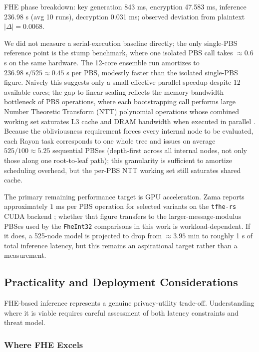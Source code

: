 \documentclass[12pt]{article}
\begin{document}
FHE phase breakdown: key generation 843 ms, encryption 47.583 ms, inference 236.98 s (avg 10 runs), decryption 0.031 ms; observed deviation from plaintext $|\Delta| = 0.0068$.

We did not measure a serial-execution baseline directly; the only single-PBS reference point is the stump benchmark, where one isolated PBS call takes $\approx 0.6$ s on the same hardware. The 12-core ensemble run amortizes to $236.98 \text{ s} / 525 \approx 0.45$ s per PBS, modestly faster than the isolated single-PBS figure. Naively this suggests only a small effective parallel speedup despite 12 available cores; the gap to linear scaling reflects the memory-bandwidth bottleneck of PBS operations, where each bootstrapping call performs large Number Theoretic Transform (NTT) polynomial operations whose combined working set saturates L3 cache and DRAM bandwidth when executed in parallel \cite{TFHE-rs}. Because the obliviousness requirement forces every internal node to be evaluated, each Rayon task corresponds to one whole tree and issues on average $525/100 \approx 5.25$ sequential PBSes (depth-first across all internal nodes, not only those along one root-to-leaf path); this granularity is sufficient to amortize scheduling overhead, but the per-PBS NTT working set still saturates shared cache.

The primary remaining performance target is GPU acceleration. Zama reports approximately $1$ ms per PBS operation for selected variants on the \texttt{tfhe-rs} CUDA backend \cite{TFHE-rs}; whether that figure transfers to the larger-message-modulus PBSes used by the \texttt{FheInt32} comparisons in this work is workload-dependent. If it does, a 525-node model is projected to drop from $\approx 3.95$ min to roughly 1 s of total inference latency, but this remains an aspirational target rather than a measurement.

\subsection{Practicality and Deployment Considerations}

FHE-based inference represents a genuine privacy-utility trade-off. Understanding where it is viable requires careful assessment of both latency constraints and threat model.

\subsubsection*{Where FHE Excels}
\end{document}
